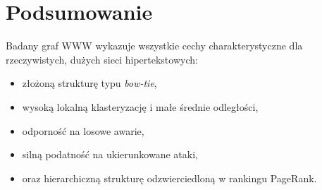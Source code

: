 \chapter{Podsumowanie}

Badany graf WWW wykazuje wszystkie cechy charakterystyczne dla rzeczywistych, dużych sieci hipertekstowych:
\begin{itemize}
    \item złożoną strukturę typu \textit{bow-tie},
    \item wysoką lokalną klasteryzację i małe średnie odległości,
    \item odporność na losowe awarie,
    \item silną podatność na ukierunkowane ataki,
    \item oraz hierarchiczną strukturę odzwierciedloną w rankingu PageRank.
\end{itemize}